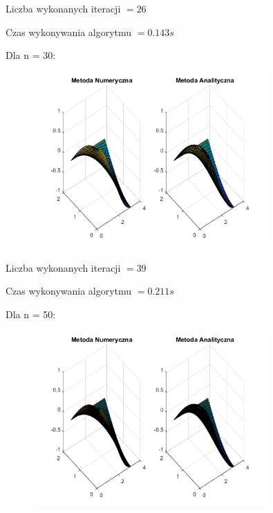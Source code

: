 Liczba wykonanych iteracji $ = 26 $

Czas wykonywania algorytmu $ = 0.143 s$

Dla n = 30:

\begin{figure}[!ht]
	\begin{center}
		\includegraphics[width=0.8\textwidth]{Lab6/charts/pr/zad2/30.png}
	\end{center}
\end{figure}

Liczba wykonanych iteracji $ = 39 $

Czas wykonywania algorytmu $ = 0.211 s$



Dla n = 50:

\begin{figure}[!ht]
	\begin{center}
		\includegraphics[width=0.8\textwidth]{Lab6/charts/pr/zad2/50.png}
	\end{center}
\end{figure}

